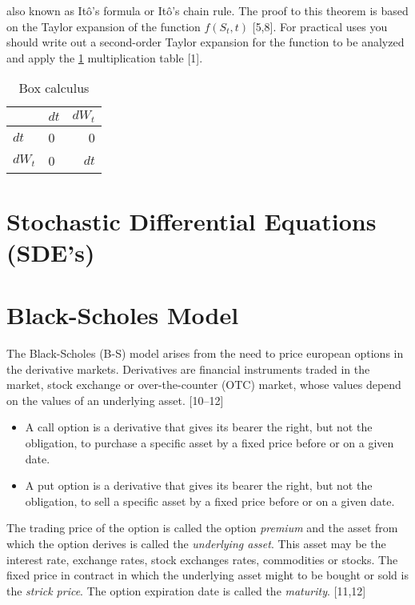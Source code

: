 \documentclass[12pt,twoside]{reedthesis}
\theoremstyle{definition}
\theoremstyle{definition}
\theoremstyle{remark}
\begin{document}
  also known as Itô's formula or Itô's chain rule. The proof to this
  theorem is based on the Taylor expansion of the function \(f(S_t, t)\)
  {[}5,8{]}. For practical uses you should write out a second-order Taylor
  expansion for the function to be analyzed and apply the
  \ref{tab:box-calc} multiplication table {[}1{]}.
  \begin{longtable}[t]{llr}
  \caption{\label{tab:box-calc}Box calculus}\\
  \toprule
    & $dt$ & $dW_t$\\
  \midrule
  $dt$ & 0 & 0\\
  $dW_t$ & 0 & $dt$\\
  \bottomrule
  \end{longtable}
  \section{Stochastic Differential Equations
  (SDE's)}\label{stochastic-differential-equations-sdes}
  
  \section{Black-Scholes Model}\label{black-scholes-model}
  
  The Black-Scholes (B-S) model arises from the need to price european
  options in the derivative markets. Derivatives are financial instruments
  traded in the market, stock exchange or over-the-counter (OTC) market,
  whose values depend on the values of an underlying asset. {[}10--12{]}
  \begin{itemize}
  \item
    A call option is a derivative that gives its bearer the right, but not
    the obligation, to purchase a specific asset by a fixed price before
    or on a given date.
  \item
    A put option is a derivative that gives its bearer the right, but not
    the obligation, to sell a specific asset by a fixed price before or on
    a given date.
  \end{itemize}
  The trading price of the option is called the option \emph{premium} and
  the asset from which the option derives is called the \emph{underlying
  asset}. This asset may be the interest rate, exchange rates, stock
  exchanges rates, commodities or stocks. The fixed price in contract in
  which the underlying asset might to be bought or sold is the
  \emph{strick price}. The option expiration date is called the
  \emph{maturity}. {[}11,12{]}
  
\end{document}
